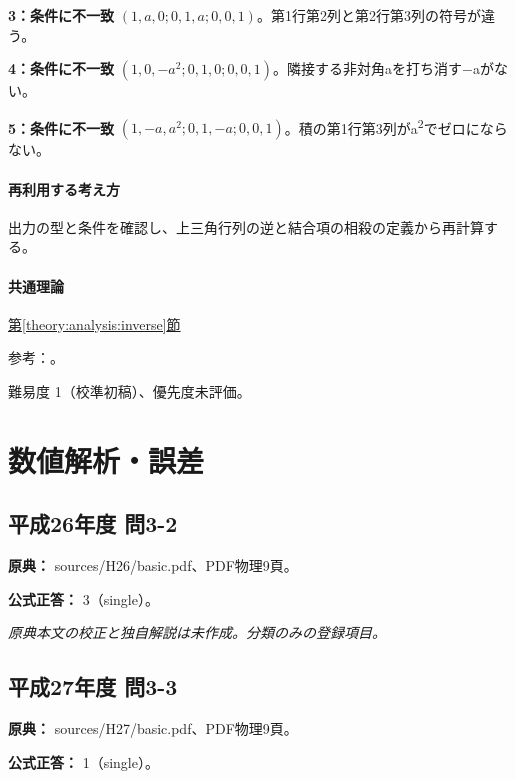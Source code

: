 \noindent\textbf{3：条件に不一致} \((1,a,0;0,1,a;0,0,1)\)。第1行第2列と第2行第3列の符号が違う。\par

\noindent\textbf{4：条件に不一致} \((1,0,-a^2;0,1,0;0,0,1)\)。隣接する非対角aを打ち消す−aがない。\par

\noindent\textbf{5：条件に不一致} \((1,-a,a^2;0,1,-a;0,0,1)\)。積の第1行第3列がa\textsuperscript{2}でゼロにならない。\par

\paragraph{再利用する考え方} 出力の型と条件を確認し、上三角行列の逆と結合項の相殺の定義から再計算する。

\paragraph{共通理論} \hyperref[theory:analysis:inverse]{第\ref*{theory:analysis:inverse}節}

\par 参考：\cite{mit_inverse2007}。

\par 難易度 1（校準初稿）、優先度未評価。

\section{数値解析・誤差}

\subsection{平成26年度 問3-2}
\label{q:h26-reg-basic-3-2}

\noindent\textbf{原典：} sources/H26/basic.pdf、PDF物理9頁。

\textbf{公式正答：} 3（single）。

\par\textit{原典本文の校正と独自解説は未作成。分類のみの登録項目。}

\subsection{平成27年度 問3-3}
\label{q:h27-reg-basic-3-3}

\noindent\textbf{原典：} sources/H27/basic.pdf、PDF物理9頁。

\textbf{公式正答：} 1（single）。

